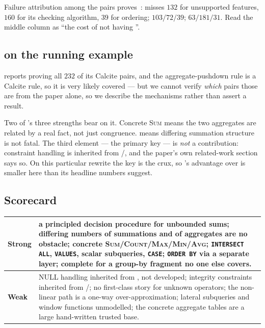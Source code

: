 Failure attribution among the pairs \sqlsolver{} proves~\cite[Tab.\ 5]{sqlsolver}: \udp{}
misses $132$ for unsupported features, $160$ for its checking algorithm, $39$ for ordering;
\spes{} $103/72/39$; \wetune{} $63/181/31$. Read the middle column as ``the cost of not
having \liastar{}''.

\subsection{\sqlsolver{} on the running example}

\sqlsolver{} reports proving all $232$ of its Calcite pairs, and the aggregate-pushdown rule
is a Calcite rule, so it is very likely covered --- but we cannot verify \emph{which} pairs
those are from the paper alone, so we describe the mechanisms rather than assert a result.

Two of \sqlsolver{}'s three strengths bear on it. Concrete \textsc{Sum} means the two
aggregates are related by a real fact, not just congruence. \liastar{} means differing
summation structure is not fatal. The third element --- the primary key --- is
\emph{not} a \sqlsolver{} contribution: constraint handling is inherited from
\udp{}/\wetune{}, and the paper's own related-work section says so. On this particular
rewrite the key is the crux, so \sqlsolver{}'s advantage over \QED{} is smaller here than
its headline numbers suggest.

\subsection{Scorecard}

\begin{table}[h]\centering\small
\begin{tabularx}{\linewidth}{@{}lX@{}}
\toprule
\textbf{Strong} & a principled decision procedure for unbounded sums; differing numbers of
summations and of aggregates are no obstacle; concrete \textsc{Sum}/\textsc{Count}/\textsc{Max}/\textsc{Min}/\textsc{Avg};
\lstinline|INTERSECT ALL|, \lstinline|VALUES|, scalar subqueries, \lstinline|CASE|;
\lstinline|ORDER BY| via a separate layer; complete for a group-by fragment no one else covers.\\
\midrule
\textbf{Weak} & NULL handling inherited from \wetune{}, not developed; integrity constraints
inherited from \udp{}/\wetune{}; no first-class story for unknown operators; the non-linear
path is a one-way over-approximation; lateral subqueries and window functions unmodelled;
the concrete aggregate tables are a large hand-written trusted base.\\
\bottomrule
\end{tabularx}
\end{table}
